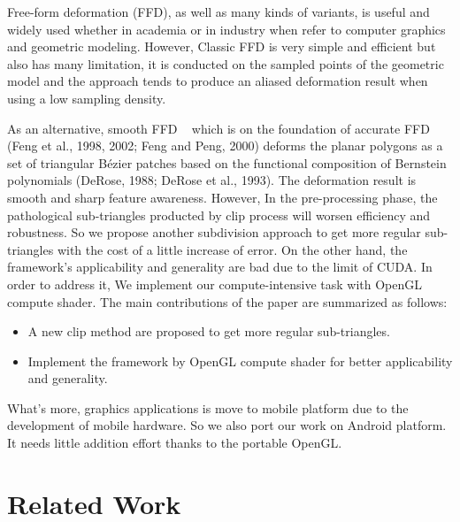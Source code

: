 \documentclass[3p]{elsarticle}
\begin{document}
Free-form deformation (FFD\cite{Sederberg86}), as well as many kinds of variants, is useful and widely used whether in academia or in industry when refer to computer graphics and geometric modeling. However, Classic FFD is very simple and efficient but also has many limitation, it is conducted on the sampled points of the geometric model and the approach tends to produce an aliased deformation result when using a low sampling density.

As an alternative, smooth FFD ~\cite{Cui13, Cui14, Cui15} which is on the foundation of accurate FFD (Feng et al., 1998, 2002; Feng and Peng, 2000) deforms the planar polygons as a set of triangular Bézier patches based on the functional composition of Bernstein polynomials (DeRose, 1988; DeRose et al., 1993). The deformation result is smooth and sharp feature awareness. However, In the pre-processing phase, the pathological sub-triangles producted by clip process will worsen efficiency and robustness. So we propose another subdivision approach to get more regular sub-triangles with the cost of a little increase of error. On the other hand, the framework's applicability and generality are bad due to the limit of CUDA. In order to address it, We implement our compute-intensive task with OpenGL compute shader.
The main contributions of the paper are summarized as follows:
\begin{itemize}
    \item A new clip method are proposed to get more regular sub-triangles.
    \item Implement the framework by OpenGL compute shader for better applicability and generality.
\end{itemize}

What's more, graphics applications is move to mobile platform due to the development of mobile hardware. So we also port our work on Android platform. It needs little addition effort thanks to the portable OpenGL.

\section{Related Work}\label{sec:related}

\end{document}
